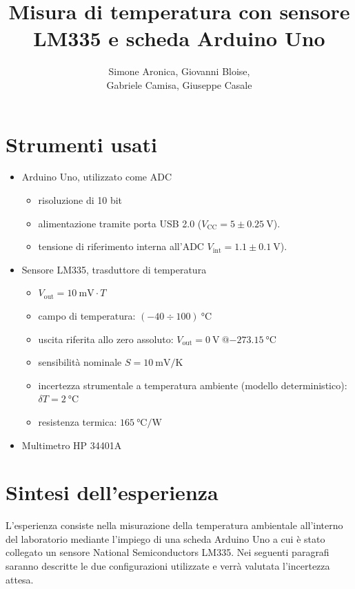 \documentclass{article}
\title{Misura di temperatura con
sensore LM335 e
scheda Arduino Uno}
\author{Simone Aronica, Giovanni Bloise, \\
Gabriele Camisa, Giuseppe Casale}
\date{}
\begin{document}
\maketitle
\tableofcontents
\pagebreak

\section{Strumenti usati}
\begin{itemize}
    \item Arduino Uno, utilizzato come ADC 
    \begin{itemize}
        \item risoluzione di 10 bit 
        \item alimentazione tramite porta USB 2.0 ($V_{\text{CC}} = 5 \pm \SI{0.25}{\volt}$).
        \item tensione di riferimento interna all'ADC $V_{\text{int}} = 1.1 \pm \SI{0.1}{\volt}$).
    \end{itemize}
    \item Sensore LM335, trasduttore di temperatura 
    \begin{itemize}
        \item $V_{\text{out}} = \SI{10}{\milli\volt} \cdot T$
        \item campo di temperatura: $(-40\div100)\SI{}{\celsius}$
        \item uscita riferita allo zero assoluto: $V_{\text{out}} = \SI{0}{\volt}\ @ \SI{-273,15}{\celsius}$
        \item sensibilità nominale $S = \SI{10}{\milli\volt\per\kelvin}$
        \item incertezza strumentale a temperatura ambiente (modello deterministico): $\delta T = \SI{2}{\celsius}$
        \item resistenza termica: $\SI{165}{\celsius\per\watt}$
    \end{itemize}
    \item Multimetro HP 34401A
\end{itemize}

\section{Sintesi dell'esperienza}
L'esperienza consiste nella misurazione della temperatura ambientale all'interno del laboratorio mediante l'impiego di una scheda Arduino Uno a cui è stato collegato un sensore National Semiconductors LM335. Nei seguenti paragrafi saranno descritte le due configurazioni utilizzate e verrà valutata l'incertezza attesa.
\end{document}
